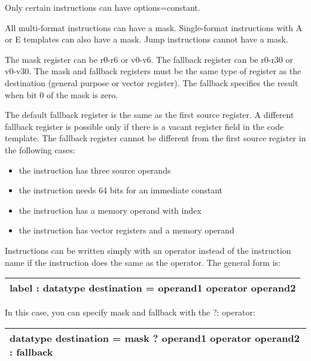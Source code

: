 \documentclass[forwardcom.tex]{subfiles}
\begin{document}
Only certain instructions can have options=constant.
\vspace{2mm}

All multi-format instructions can have a mask. Single-format instructions with A or E templates can also have a mask. Jump instructions cannot have a mask.
\vspace{2mm}

The mask register can be r0-r6 or v0-v6. The fallback register can be r0-r30 or v0-v30.
The mask and fallback registers must be the same type of register as the destination (general purpose or vector register). The fallback specifies the result when bit 0 of the mask is zero.
\vspace{2mm}

The default fallback register is the same as the first source register. A different fallback register is  possible only if there is a vacant register field in the code template. 
The fallback register cannot be different from the first source register in the following cases:
\begin{itemize}
\item the instruction has three source operands
\item the instruction needs 64 bits for an immediate constant
\item the instruction has a memory operand with index
\item the instruction has vector registers and a memory operand
\end{itemize}
\vspace{2mm}

Instructions can be written simply with an operator instead of the instruction name if the instruction does the same as the operator. The general form is:
\vspace{2mm}

\begin{tabular}{|p{140mm}|}
\hline
\hspace{4mm} label : datatype destination = operand1 operator operand2 \\
\hline
\end{tabular}
\vspace{4mm}

In this case, you can specify mask and fallback with the ?: operator:
\vspace{2mm}

\begin{tabular}{|p{140mm}|}
\hline
\hspace{4mm} datatype destination = mask ? operand1 operator operand2 : fallback\\
\hline
\end{tabular}
\vspace{4mm}
\end{document}
